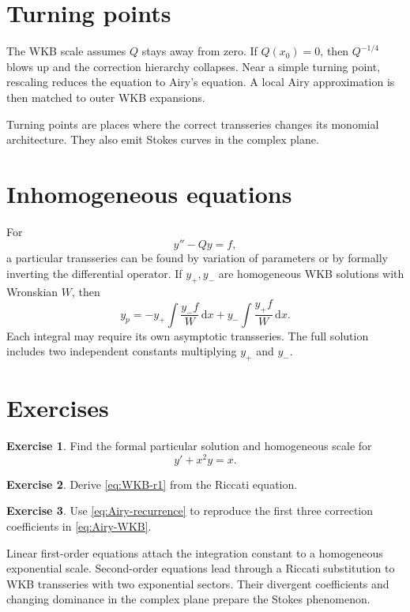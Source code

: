 \documentclass[11pt,openany]{book}
\theoremstyle{definition}
\newtheorem{exercise}{Exercise}[chapter]
\theoremstyle{plain}
\theoremstyle{remark}
\newcommand{\dd}{\,\mathrm{d}}
\begin{document}
\section{Turning points}

The WKB scale assumes $Q$ stays away from zero. If $Q(x_0)=0$, then $Q^{-1/4}$ blows up and the correction hierarchy collapses. Near a simple turning point, rescaling reduces the equation to Airy's equation. A local Airy approximation is then matched to outer WKB expansions.

Turning points are places where the correct transseries changes its monomial architecture. They also emit Stokes curves in the complex plane.

\section{Inhomogeneous equations}

For
\[
 y''-Qy=f,
\]
a particular transseries can be found by variation of parameters or by formally inverting the differential operator. If $y_+,y_-$ are homogeneous WKB solutions with Wronskian $W$, then
\[
 y_p=-y_+\int\frac{y_-f}{W}\dd x
 +y_-\int\frac{y_+f}{W}\dd x.
\]
Each integral may require its own asymptotic transseries. The full solution includes two independent constants multiplying $y_+$ and $y_-$.

\section{Exercises}

\begin{exercise}
Find the formal particular solution and homogeneous scale for
\[
 y'+x^2y=x.
\]
\end{exercise}

\begin{exercise}
Derive \cref{eq:WKB-r1} from the Riccati equation.
\end{exercise}

\begin{exercise}
Use \cref{eq:Airy-recurrence} to reproduce the first three correction coefficients in \cref{eq:Airy-WKB}.
\end{exercise}

\begin{summarybox}
Linear first-order equations attach the integration constant to a homogeneous exponential scale. Second-order equations lead through a Riccati substitution to WKB transseries with two exponential sectors. Their divergent coefficients and changing dominance in the complex plane prepare the Stokes phenomenon.
\end{summarybox}
\end{document}
